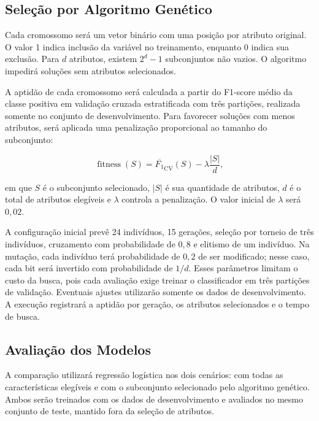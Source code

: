 \documentclass[12pt]{article}
\begin{document}
\subsection{Seleção por Algoritmo Genético}

Cada cromossomo será um vetor binário com uma posição por atributo original. O
valor 1 indica inclusão da variável no treinamento, enquanto 0 indica sua
exclusão. Para $d$ atributos, existem $2^d-1$ subconjuntos não vazios. O
algoritmo impedirá soluções sem atributos selecionados.

A aptidão de cada cromossomo será calculada a partir do F1-score médio da
classe positiva em validação cruzada estratificada com três partições,
realizada somente no conjunto de desenvolvimento. Para favorecer soluções com
menos atributos, será aplicada uma penalização proporcional ao tamanho do
subconjunto:

\begin{equation}
  \operatorname{fitness}(S) =
  \overline{F_1}_{\mathrm{CV}}(S) - \lambda\frac{|S|}{d},
  \label{eq:fitness}
\end{equation}

\noindent em que $S$ é o subconjunto selecionado, $|S|$ é sua quantidade de
atributos, $d$ é o total de atributos elegíveis e $\lambda$ controla a
penalização. O valor inicial de $\lambda$ será $0{,}02$.

A configuração inicial prevê 24 indivíduos, 15 gerações, seleção por
torneio de três indivíduos, cruzamento com probabilidade de $0{,}8$ e elitismo
de um indivíduo. Na mutação, cada indivíduo terá probabilidade de $0{,}2$ de
ser modificado; nesse caso, cada bit será invertido com probabilidade de
$1/d$. Esses parâmetros limitam o custo da busca, pois cada avaliação exige
treinar o classificador em três partições de validação. Eventuais ajustes
utilizarão somente os dados de desenvolvimento. A execução registrará a
aptidão por geração, os atributos selecionados e o tempo de busca.

\subsection{Avaliação dos Modelos}

A comparação utilizará regressão logística nos dois cenários: com todas as
características elegíveis e com o subconjunto selecionado pelo algoritmo
genético. Ambos serão treinados com os dados de desenvolvimento e avaliados no
mesmo conjunto de teste, mantido fora da seleção de atributos.
\end{document}
